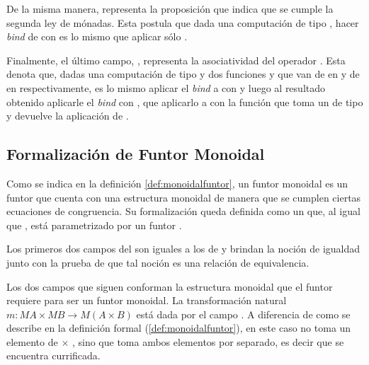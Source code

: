 De la misma manera,  representa la proposición que indica que se cumple la segunda ley de mónadas. Esta postula que dada una computación  de tipo , hacer \textit{bind} de  con  es lo mismo que aplicar sólo . 

Finalmente, el último campo, , representa la asociatividad del operador \hbox{\AgdaField{$\_\gg=\_$}}. Esta denota que, dadas una computación  de tipo  y dos funciones  y  que van de  en  y de  en  respectivamente, es lo mismo aplicar el \textit{bind} a  con  y luego al resultado obtenido aplicarle el \textit{bind} con , que aplicarlo a  con la función que toma un  de tipo  y devuelve la aplicación de  \AgdaField{$\gg=$} .

\subsection{Formalización de Funtor Monoidal}\label{funtmon:funt}

Como se indica en la definición \ref{def:monoidalfuntor}, un funtor monoidal es un funtor que cuenta con una estructura monoidal de manera que se cumplen ciertas ecuaciones de congruencia. Su formalización queda definida como un  que, al igual que , está parametrizado por un funtor  \AgdaSymbol{:}  \AgdaSymbol{$\rightarrow$} . 


Los primeros dos campos del  son iguales a los de  y brindan la noción de igualdad junto con la prueba de que tal noción es una relación de equivalencia. 

Los dos campos que siguen conforman la estructura monoidal que el funtor requiere para ser un funtor monoidal. La transformación natural $m : \mathit{M} A \times \mathit{M} B \rightarrow \mathit{M} (A \times B)$ está dada por el campo . A diferencia de como se describe en la definición formal (\ref{def:monoidalfuntor}), en este caso  no toma un elemento de  $\times$ , sino que toma ambos elementos por separado, es decir que se encuentra currificada. 

